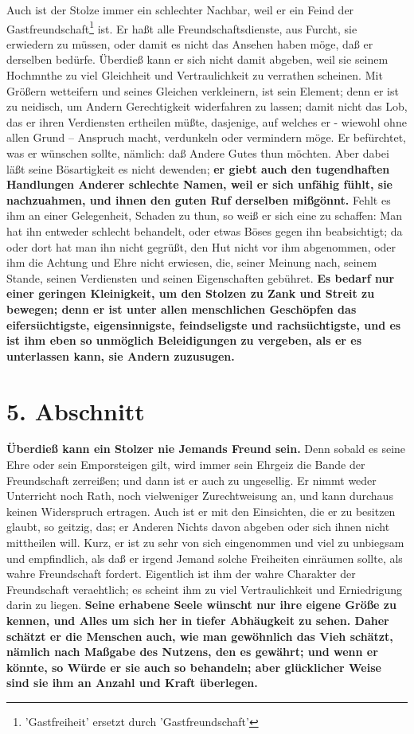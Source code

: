Auch ist der Stolze immer ein schlechter Nachbar, weil er ein Feind der
Gastfreundschaft\footnote{'Gastfreiheit' ersetzt durch
'Gastfreundschaft'} ist. Er haßt alle
Freundschaftsdienste, aus Furcht, sie erwiedern
zu müssen, oder damit es nicht das Ansehen haben möge, daß er derselben bedürfe.
Überdieß kann er sich nicht damit abgeben, weil sie seinem Hochmnthe zu viel
Gleichheit und Vertraulichkeit zu verrathen scheinen. Mit
Größern wetteifern und
seines Gleichen verkleinern, ist sein Element; denn er ist zu neidisch, um
Andern Gerechtigkeit widerfahren zu lassen; damit nicht das Lob, das
er ihren
Verdiensten ertheilen müßte, dasjenige, auf welches er - wiewohl ohne allen
Grund -- Anspruch macht, verdunkeln oder vermindern möge. Er befürchtet, was er
wünschen sollte, nämlich: daß Andere Gutes thun möchten. Aber dabei läßt seine
Bösartigkeit es nicht dewenden; \textbf{er giebt auch den tugendhaften
Handlungen
Anderer schlechte Namen, weil er sich unfähig fühlt, sie nachzuahmen, und ihnen
den guten Ruf derselben mißgönnt.} Fehlt es ihm an einer Gelegenheit, Schaden zu
thun, so weiß er sich eine zu schaffen: Man hat ihn entweder schlecht behandelt,
oder etwas Böses gegen ihn beabsichtigt; da oder dort hat man ihn nicht gegrüßt,
den Hut nicht vor ihm abgenommen, oder ihm die Achtung und Ehre nicht erwiesen,
die, seiner Meinung nach, seinem Stande, seinen Verdiensten und seinen
Eigenschaften gebühret. \textbf{Es bedarf nur einer geringen Kleinigkeit, um den
Stolzen
zu Zank und Streit zu bewegen; denn er ist unter allen
menschlichen Geschöpfen
das eifersüchtigste, eigensinnigste, feindseligste und rachsüchtigste, und es
ist ihm eben so unmöglich Beleidigungen zu vergeben, als er es unterlassen kann,
sie Andern zuzusugen.}

\section{5. Abschnitt} \label{kap12_ab5}

\textbf{Überdieß kann ein Stolzer nie Jemands Freund sein.} Denn sobald es seine
Ehre
oder sein Emporsteigen gilt, wird immer sein Ehrgeiz die Bande der Freundschaft
zerreißen; und dann ist er auch zu ungesellig. Er nimmt weder Unterricht noch
Rath, noch vielweniger Zurechtweisung an, und kann
durchaus keinen Widerspruch
ertragen. Auch ist er mit den Einsichten, die er zu besitzen glaubt, so geitzig,
das; er Anderen Nichts davon abgeben oder sich ihnen nicht mittheilen will.
Kurz, er ist zu sehr von sich eingenommen und viel zu unbiegsam und empfindlich,
als daß er irgend Jemand solche Freiheiten einräumen sollte, als wahre
Freundschaft fordert. Eigentlich ist ihm der wahre Charakter der Freundschaft
veraehtlich; es scheint ihm zu viel Vertraulichkeit und Erniedrigung darin zu
liegen. \textbf{Seine erhabene Seele wünscht nur ihre eigene Größe zu kennen,
und Alles
um sich her in tiefer Abhäugkeit zu sehen. Daher schätzt er die Menschen auch,
wie man gewöhnlich das Vieh schätzt, nämlich nach Maßgabe des Nutzens, den es
gewährt; und wenn er könnte, so Würde er sie auch so behandeln; aber glücklicher
Weise sind sie ihm an Anzahl und Kraft überlegen.}

